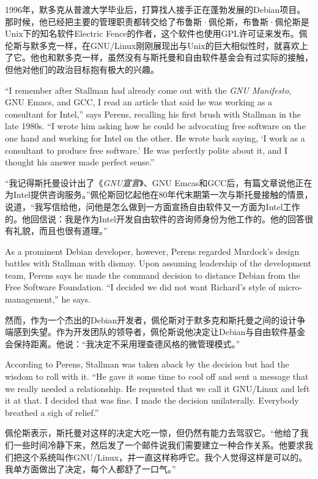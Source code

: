 \ifdefined\chs
1996年，默多克从普渡大学毕业后，打算找人接手正在蓬勃发展的Debian项目。那时候，他已经把主要的管理职责都转交给了布鲁斯·佩伦斯，布鲁斯·佩伦斯是Unix下的知名软件Electric Fence的作者，这个软件也使用GPL许可证来发布。佩伦斯与默多克一样，在GNU/Linux刚刚展现出与Unix的巨大相似性时，就喜欢上了它。他也和默多克一样，虽然没有与斯托曼和自由软件基金会有过实际的接触，但他对他们的政治目标抱有极大的兴趣。
\fi

\ifdefined\eng
``I remember after Stallman had already come out with the \textit{GNU Manifesto}, GNU Emacs, and GCC, I read an article that said he was working as a consultant for Intel,'' says Perens, recalling his first brush with Stallman in the late 1980s. ``I wrote him asking how he could be advocating free software on the one hand and working for Intel on the other. He wrote back saying, `I work as a consultant to produce free software.' He was perfectly polite about it, and I thought his answer made perfect sense.''
\fi

\ifdefined\chs
``我记得斯托曼设计出了《\textit{GNU宣言}》、GNU Emcas和GCC后，有篇文章说他正在为Intel提供咨询服务。''佩伦斯回忆起他在80年代末期第一次与斯托曼接触的情景，说道，``我写信给他，问他是怎么做到一方面宣扬自由软件又一方面为Intel工作的。他回信说：我是作为Intel开发自由软件的咨询师身份为他工作的。他的回答很有礼貌，而且也很有道理。''
\fi

\ifdefined\eng
As a prominent Debian developer, however, Perens regarded Murdock's design battles with Stallman with dismay. Upon assuming leadership of the development team, Perens says he made the command decision to distance Debian from the Free Software Foundation. ``I decided we did not want Richard's style of micro-management,'' he says.
\fi

\ifdefined\chs
然而，作为一个杰出的Debian开发者，佩伦斯对于默多克和斯托曼之间的设计争端感到失望。作为开发团队的领导者，佩伦斯说他决定让Debian与自由软件基金会保持距离。他说：``我决定不采用理查德风格的微管理模式。''
\fi

\ifdefined\eng
According to Perens, Stallman was taken aback by the decision but had the wisdom to roll with it. ``He gave it some time to cool off and sent a message that we really needed a relationship. He requested that we call it GNU/Linux and left it at that. I decided that was fine. I made the decision unilaterally. Everybody breathed a sigh of relief.''
\fi

\ifdefined\chs
佩伦斯表示，斯托曼对这样的决定大吃一惊，但仍然有能力去驾驭它。``他给了我们一些时间冷静下来，然后发了一个邮件说我们需要建立一种合作关系。他要求我们把这个系统叫作GNU/Linux，并一直这样称呼它。我个人觉得这样是可以的。我单方面做出了决定，每个人都舒了一口气。''
\fi

